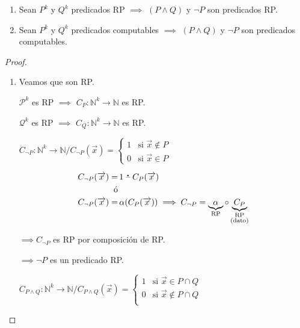 \begin{teorema}{}{}
    \begin{enumerate}
        \item Sean $P^k$ y ${Q}^k$ predicados RP $\implies$
            $(P \wedge Q)$ y $\neg P$ son predicados RP.
        \item Sean ${P}^k$ y ${Q}^k$ predicados computables
            $\implies$ $(P \wedge Q)$ y $\neg P$ son predicados computables.
    \end{enumerate}
\end{teorema}

\begin{proof} \phantom{.}
    \begin{enumerate}
        \item Veamos que son RP.

            $\mathcal{P}^k$ es RP $\implies$ 
            $C_{{P}}: \mathbb{N}^k \to \mathbb{N}$ es RP.

            $\mathcal{Q}^k$ es RP $\implies$ 
            $C_{Q}: \mathbb{N}^k \to \mathbb{N}$ es RP.

            $C_{\neg P}: \mathbb{N}^k \to \mathbb{N} /
            C_{\neg P} (\overrightarrow{x}) = 
            \begin{cases}
                1 & \text{si } \overrightarrow{x} \notin {P} \\
                0 & \text{si } \overrightarrow{x} \in {P}
            \end{cases}$

            \begin{align*}
                C_{\neg P} (\overrightarrow{x}) =& \, 
                1 \;\accentset{\mbox{\large\bfseries .}}{\text{--}}\; C_{P}(\overrightarrow{x})\\
                \text{ó}& \\
                C_{\neg P} (\overrightarrow{x}) =& \,
                \alpha(C_{P}(\overrightarrow{x})) \implies C_{\neg P} 
                = \underbrace{\alpha}_{\text{RP}} \circ 
            \underbrace{C_P}_{\substack{\text{RP}\\ \text{(dato)}}}
            \end{align*}

            $\implies C_{\neg P}$ es RP por composición de RP.

            $\implies \neg P$ es un predicado RP.


            $C_{P \wedge Q}: \mathbb{N}^k \to \mathbb{N} /
            C_{P \wedge Q} (\overrightarrow{x}) = 
            \begin{cases}
                1 & \text{si } \overrightarrow{x} \in 
                P \cap Q \\
                0 & \text{si } \overrightarrow{x} \notin
                P \cap Q \\
            \end{cases}$


\end{enumerate}
\end{proof}

